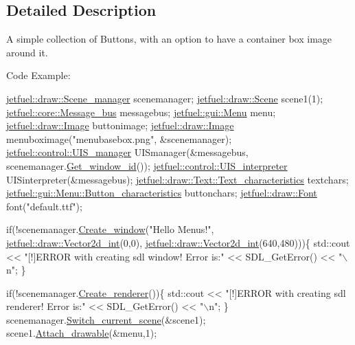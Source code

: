 \subsection{Detailed Description}
A simple collection of Buttons, with an option to have a container box image around it.

Code Example\+: 
\begin{DoxyCode}
\hyperlink{classjetfuel_1_1draw_1_1Scene__manager}{jetfuel::draw::Scene\_manager} scenemanager;
\hyperlink{classjetfuel_1_1draw_1_1Scene}{jetfuel::draw::Scene} scene1(1);
\hyperlink{classjetfuel_1_1core_1_1Message__bus}{jetfuel::core::Message\_bus} messagebus;
\hyperlink{classjetfuel_1_1gui_1_1Menu}{jetfuel::gui::Menu} menu;
\hyperlink{classjetfuel_1_1draw_1_1Image}{jetfuel::draw::Image} buttonimage;
\hyperlink{classjetfuel_1_1draw_1_1Image}{jetfuel::draw::Image} menuboximage(\textcolor{stringliteral}{"menubasebox.png"},
                                          &scenemanager);
\hyperlink{classjetfuel_1_1control_1_1UIS__manager}{jetfuel::control::UIS\_manager} UISmanager(&messagebus,
                                  scenemanager.\hyperlink{classjetfuel_1_1draw_1_1Scene__manager_a1758a86d40dcfaface8958fcd33676bf}{Get\_window\_id}());
\hyperlink{classjetfuel_1_1control_1_1UIS__interpreter}{jetfuel::control::UIS\_interpreter} UISinterpreter(&messagebus);
\hyperlink{structjetfuel_1_1draw_1_1Text_1_1Text__characteristics}{jetfuel::draw::Text::Text\_characteristics} textchars;
\hyperlink{structjetfuel_1_1gui_1_1Menu_1_1Button__characteristics}{jetfuel::gui::Menu::Button\_characteristics} buttonchars;
\hyperlink{classjetfuel_1_1draw_1_1Font}{jetfuel::draw::Font} font(\textcolor{stringliteral}{"default.ttf"});

\textcolor{keywordflow}{if}(!scenemanager.\hyperlink{classjetfuel_1_1draw_1_1Scene__manager_a5113e9062c272a22d383ba872417ba31}{Create\_window}(\textcolor{stringliteral}{"Hello Menus!"},
                               \hyperlink{classjetfuel_1_1draw_1_1Vector2d}{jetfuel::draw::Vector2d\_int}(0,0),
                          \hyperlink{classjetfuel_1_1draw_1_1Vector2d}{jetfuel::draw::Vector2d\_int}(640,480)))\{
    std::cout << \textcolor{stringliteral}{"[!]ERROR with creating sdl window! Error is:"}
    << SDL\_GetError() << \textcolor{stringliteral}{"\(\backslash\)n"};
\}

\textcolor{keywordflow}{if}(!scenemanager.\hyperlink{classjetfuel_1_1draw_1_1Scene__manager_afafecd926ce5e4b2543a6d583a7d24b6}{Create\_renderer}())\{
    std::cout << \textcolor{stringliteral}{"[!]ERROR with creating sdl renderer! Error is:"}
    << SDL\_GetError() << \textcolor{stringliteral}{"\(\backslash\)n"};
\}
scenemanager.\hyperlink{classjetfuel_1_1draw_1_1Scene__manager_a770c163b88ba8427539ee182315ea989}{Switch\_current\_scene}(&scene1);
scene1.\hyperlink{classjetfuel_1_1draw_1_1Scene_aea4b4c4ae25c30d661be4c52787e0ea3}{Attach\_drawable}(&menu,1);


\end{DoxyCode}
